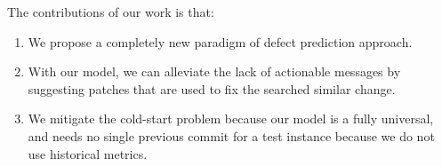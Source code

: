 \vspace{3mm}
The contributions of our work is that:
\begin{enumerate}
    \item We propose a completely new paradigm of defect prediction approach.
    \item With our model, we can alleviate the lack of actionable messages by suggesting patches that are used to fix the searched similar change.
    \item We mitigate the cold-start problem because our model is a fully universal, and needs no single previous commit for a test instance because we do not use historical metrics.
\end{enumerate}